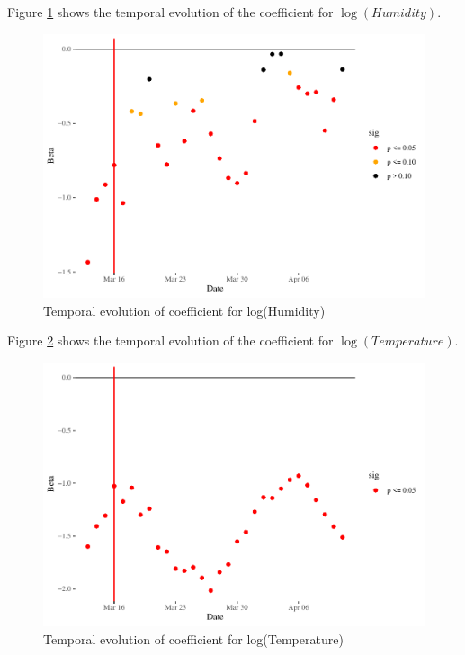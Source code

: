 \documentclass[]{elsarticle} %
\makeatletter
\def\maxwidth{\ifdim\Gin@nat@width>\linewidth\linewidth
\else\Gin@nat@width\fi}
\let\Oldincludegraphics\includegraphics
\renewcommand{\includegraphics}[1]{\Oldincludegraphics[width=\maxwidth]{#1}}
\makeatother
\begin{document}
Figure \ref{fig:beta-humidity-time} shows the temporal evolution of the
coefficient for \(\log(Humidity)\).

\begin{figure}
\centering
\includegraphics{Environmental-Correlates-of-COVID19-Spain_files/figure-latex/beta-humidity-time-1.pdf}
\caption{\label{fig:beta-humidity-time}Temporal evolution of coefficient
for log(Humidity)}
\end{figure}

Figure \ref{fig:beta-temperature-time} shows the temporal evolution of
the coefficient for \(\log(Temperature)\).

\begin{figure}
\centering
\includegraphics{Environmental-Correlates-of-COVID19-Spain_files/figure-latex/beta-temperature-time-1.pdf}
\caption{\label{fig:beta-temperature-time}Temporal evolution of
coefficient for log(Temperature)}
\end{figure}
\end{document}
